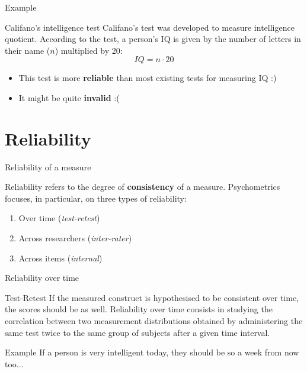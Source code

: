 \documentclass{beamer}
\begin{document}
\begin{frame}{Example}
\begin{block}{Califano's intelligence test}
    Califano's test was developed to measure intelligence quotient. According to the test, a person's IQ is given by the number of letters in their name ($n$) multiplied by 20: \\
    \[
    IQ = n \cdot 20
    \]
\end{block}
\pause
\begin{itemize}
    \item This test is more \textbf{reliable} than most existing tests for measuring IQ :)
    \pause
    \item It might be quite \textbf{invalid} :(
\end{itemize}
\end{frame}

\section{Reliability}
\begin{frame}{Reliability of a measure}
    \begin{block}{Reliability}
        refers to the degree of \textbf{consistency} of a measure. Psychometrics focuses, in particular, on three types of reliability:
    \end{block}
    \begin{enumerate}
        \item Over time (\textit{test-retest})
        \item Across researchers (\textit{inter-rater})
        \item Across items (\textit{internal})
    \end{enumerate}
\end{frame}

\begin{frame}{Reliability over time}
    \begin{block}{Test-Retest}
        If the measured construct is hypothesised to be consistent over time, the scores should be as well. Reliability over time consists in studying the correlation between two measurement distributions obtained by administering the same test twice to the same group of subjects after a given time interval.
    \end{block}
    \begin{block}{Example}
        If a person is very intelligent today, they should be so a week from now too...
    \end{block}
\end{frame}
\end{document}
